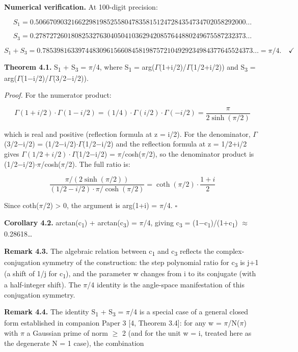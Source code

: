 \documentclass[11pt]{article}
\begin{document}
\textbf{Numerical verification.} At 100-digit precision:

\[S_1 = 0.50667090321662298198525580478358151247284354734702058292000\ldots\]

\[S_3 = 0.27872726018082532763040504103629420857644880249675587232373\ldots\]

\[S_1 + S_3 = 0.78539816339744830961566084581987572104929234984377645524373\ldots = \pi/4. \quad \checkmark\]

\textbf{Theorem 4.1.} S\textsubscript{1} + S\textsubscript{3} =
\(\pi\)/4, where S\textsubscript{1} =
arg(\(\Gamma\)(1+i/2)/\(\Gamma\)(1/2+i/2)) and S\textsubscript{3} =
arg(\(\Gamma\)(1−i/2)/\(\Gamma\)(3/2−i/2)).

\emph{Proof.} For the numerator product:

\[\Gamma(1+i/2)\cdot\Gamma(1-i/2) = (1/4)\cdot\Gamma(i/2)\cdot\Gamma(-i/2) = \frac{\pi}{2\sinh(\pi/2)}\]

which is real and positive (reflection formula at z = i/2). For the
denominator, \(\Gamma\)(3/2−i/2) = (1/2−i/2)\(\cdot \Gamma\)(1/2−i/2)
and the reflection formula at z = 1/2+i/2 gives
\(\Gamma(1/2+i/2)\cdot \Gamma\)(1/2−i/2) = \(\pi\)/cosh(\(\pi\)/2), so
the denominator product is (1/2−i/2)\(\cdot \pi\)/cosh(\(\pi\)/2). The
full ratio is:

\[\frac{\pi/(2\sinh(\pi/2))}{(1/2-i/2)\cdot\pi/\cosh(\pi/2)} = \coth(\pi/2)\cdot\frac{1+i}{2}\]

Since coth(\(\pi\)/2) \textgreater{} 0, the argument is arg(1+i) =
\(\pi\)/4. \(\square\)

\textbf{Corollary 4.2.} arctan(c\textsubscript{1}) +
arctan(c\textsubscript{3}) = \(\pi\)/4, giving c\textsubscript{3} =
(1−c\textsubscript{1})/(1+c\textsubscript{1}) \(\approx\)
0.28618\ldots{}

\textbf{Remark 4.3.} The algebraic relation between c\textsubscript{1}
and c\textsubscript{3} reflects the complex-conjugation symmetry of the
construction: the step polynomial ratio for c\textsubscript{3} is j+1 (a
shift of 1/j for c\textsubscript{1}), and the parameter w changes from i
to its conjugate (with a half-integer shift). The \(\pi\)/4 identity is
the angle-space manifestation of this conjugation symmetry.

\textbf{Remark 4.4.} The identity S\textsubscript{1} +
S\textsubscript{3} = \(\pi\)/4 is a special case of a general closed
form established in companion Paper 3 {[}4, Theorem 3.4{]}: for any w =
\(\pi\)/N(\(\pi\)) with \(\pi\) a Gaussian prime of norm \(\geq\) 2 (and
for the unit w = i, treated here as the degenerate N = 1 case), the
combination
\end{document}

